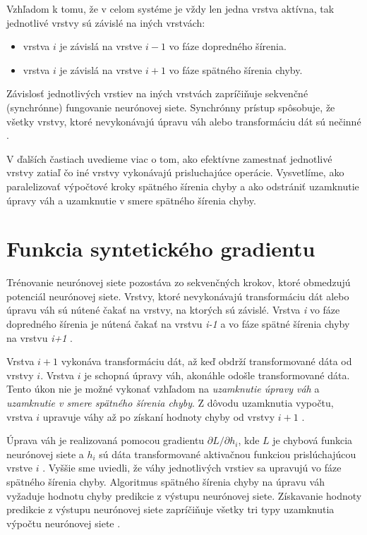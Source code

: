 Vzhľadom k tomu, že v celom systéme je vždy len jedna vrstva aktívna, tak jednotlivé vrstvy sú závislé na iných vrstvách:
\begin{itemize}
    \item vrstva $i$ je závislá na vrstve $i-1$ vo fáze dopredného šírenia.
    \item vrstva $i$ je závislá na vrstve $i+1$ vo fáze spätného šírenia chyby.
\end{itemize}
Závislosť jednotlivých vrstiev na iných vrstvách zapríčiňuje sekvenčné (synchrónne) fungovanie neurónovej siete. Synchrónny prístup spôsobuje, že všetky vrstvy, ktoré nevykonávajú úpravu váh alebo transformáciu dát sú nečinné \cite{Jaderberg2016}.

V ďalších častiach uvedieme viac o tom, ako efektívne zamestnať jednotlivé vrstvy zatiaľ čo iné vrstvy vykonávajú prisluchajúce operácie. Vysvetlíme, ako paralelizovať výpočtové kroky spätného šírenia chyby a ako odstrániť uzamknutie úpravy váh a uzamknutie v smere spätného šírenia chyby.

\section{Funkcia syntetického gradientu}
\label{understanding_SG} %
Trénovanie neurónovej siete pozostáva zo sekvenčných krokov, ktoré obmedzujú potenciál neurónovej siete. Vrstvy, ktoré nevykonávajú transformáciu dát alebo úpravu váh sú nútené čakať na vrstvy, na ktorých sú závislé. Vrstva \textit{i} vo fáze dopredného šírenia je nútená čakať na vrstvu \textit{i-1} a vo fáze spätné šírenia chyby na vrstvu \textit{i+1} \cite{Jaderberg2016}. 

Vrstva $i+1$ vykonáva transformáciu dát, až keď obdrží transformované dáta od vrstvy $i$. Vrstva $i$ je schopná úpravy váh, akonáhle odošle transformované dáta. Tento úkon nie je možné vykonať vzhľadom na \textit{uzamknutie úpravy váh} a \textit{uzamknutie v smere spätného šírenia chyby}. Z dôvodu uzamknutia vypočtu, vrstva $i$ upravuje váhy až po získaní hodnoty chyby od vrstvy $i+1$ \cite{Jaderberg2016}.


Úprava váh je realizovaná pomocou gradientu $\partial L/\partial h_i$, kde $L$ je chybová funkcia neurónovej siete a $h_i$ sú dáta transformované aktivačnou funkciou prislúchajúcou vrstve $i$ \cite{Goh1995}. Vyššie sme uviedli, že váhy jednotlivých vrstiev sa upravujú vo fáze spätného šírenia chyby. Algoritmus spätného šírenia chyby na úpravu váh vyžaduje hodnotu chyby predikcie z výstupu neurónovej siete. Získavanie hodnoty predikcie z výstupu neurónovej siete zapríčiňuje všetky tri typy uzamknutia výpočtu neurónovej siete \cite{Goh1995, Czarnecki2017, Jaderberg2016}.

